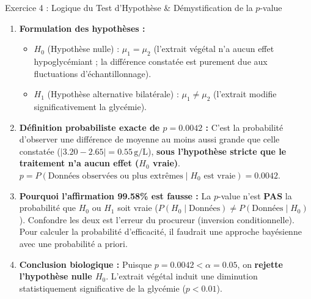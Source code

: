 \documentclass[11pt,a4paper]{article}
\begin{document}
\begin{solutionbox}{Exercice 4 : Logique du Test d'Hypothèse \& Démystification de la $p$-value}
\begin{enumerate}[label=\textbf{\alph*.}]
  \item \textbf{Formulation des hypothèses :}
  \begin{itemize}
    \item $H_0$ (Hypothèse nulle) : $\mu_1 = \mu_2$ (l'extrait végétal n'a aucun effet hypoglycémiant ; la différence constatée est purement due aux fluctuations d'échantillonnage).
    \item $H_1$ (Hypothèse alternative bilatérale) : $\mu_1 \neq \mu_2$ (l'extrait modifie significativement la glycémie).
  \end{itemize}

  \item \textbf{Définition probabiliste exacte de $p = 0.0042$ :}
  C'est la probabilité d'observer une différence de moyenne au moins aussi grande que celle constatée ($|3.20 - 2.65| = 0.55\,\text{g/L}$), \textbf{sous l'hypothèse stricte que le traitement n'a aucun effet ($H_0$ vraie)}.
  $p = P(\text{Données observées ou plus extrêmes} \mid H_0 \text{ est vraie}) = 0.0042$.

  \item \textbf{Pourquoi l'affirmation 99.58\% est fausse :}
  La $p$-value n'est \textbf{PAS} la probabilité que $H_0$ ou $H_1$ soit vraie ($P(H_0 \mid \text{Données}) \neq P(\text{Données} \mid H_0)$). Confondre les deux est l'erreur du procureur (inversion conditionnelle). Pour calculer la probabilité d'efficacité, il faudrait une approche bayésienne avec une probabilité a priori.

  \item \textbf{Conclusion biologique :}
  Puisque $p = 0.0042 < \alpha = 0.05$, on \textbf{rejette l'hypothèse nulle $H_0$}. L'extrait végétal induit une diminution statistiquement significative de la glycémie ($p < 0.01$).
\end{enumerate}
\end{solutionbox}
\end{document}
